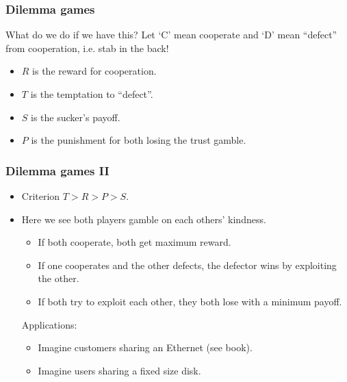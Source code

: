 \documentclass{beamer}
\begin{document}
\begin{frame}
\frametitle{Dilemma games}

What do we do if we have this? Let `C' mean cooperate and `D'
mean ``defect'' from cooperation, i.e. stab in the back!


\begin{itemize}
\item $R$ is the reward for cooperation.
\item $T$ is the temptation to ``defect''.
\item $S$ is the sucker's payoff.
\item $P$ is the punishment for both losing the trust gamble.
\end{itemize}
\end{frame}


\begin{frame}
\frametitle{Dilemma games II}

\begin{itemize}
\item Criterion $T>R>P>S$. 

\item Here we see both players gamble on each others' kindness.

\begin{itemize}
\item If both cooperate, both get maximum reward.
\item If one cooperates and the other defects, the defector wins by exploiting the other.
\item If both try to exploit each other, they both lose with a minimum payoff.
\end{itemize}

Applications:
\begin{itemize}
\item \alert{Imagine customers sharing an Ethernet (see book).}
\item \alert{Imagine users sharing a fixed size disk.}
\end{itemize}
\end{itemize}
\end{frame}
\end{document}
